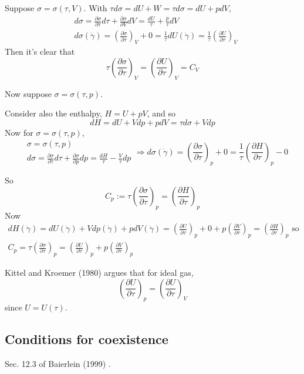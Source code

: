 \documentclass[10pt]{amsart}
\begin{document}
\begin{multicols*}{2}
Suppose $\sigma = \sigma(\tau, V)$.  With $\tau d\sigma = dU + W = \tau d\sigma = dU + pdV$, 
\[
\begin{aligned}
  & d\sigma = \frac{ \partial \sigma }{ \partial \tau } d\tau + \frac{ \partial \sigma }{ \partial V} dV = \frac{dU}{ \tau} + \frac{p}{\tau} dV \\ 
  & d\sigma(\dot{\gamma}) = \left( \frac{ \partial \sigma}{ \partial \tau} \right)_V + 0 = \frac{1}{\tau} dU(\dot{\gamma}) = \frac{1}{\tau} \left( \frac{ \partial U}{ \partial \tau} \right)_V
\end{aligned}
\]
Then it's clear that 
\[
\tau \left( \frac{ \partial \sigma }{ \partial \tau } \right)_V = \left( \frac{ \partial U}{ \partial \tau} \right)_V = C_V
\]

Now suppose $\sigma = \sigma(\tau, p)$.  

Consider also the enthalpy,  $H = U + pV$, and so
\[
dH = dU + Vdp + pdV = \tau d\sigma + Vdp
\]
Now for $\sigma = \sigma(\tau,p)$,
\[
\begin{aligned}
  & \sigma = \sigma(\tau,p) \\ 
  & d\sigma = \frac{ \partial \sigma }{ \partial \tau} d\tau + \frac{ \partial \sigma }{ \partial p } dp = \frac{dH}{\tau} - \frac{V}{\tau} dp
\end{aligned} \Longrightarrow d\sigma(\dot{\gamma}) = \left( \frac{ \partial \sigma }{ \partial \tau} \right)_p + 0 = \frac{1}{\tau} \left( \frac{ \partial H}{ \partial \tau} \right)_p - 0 
\]

So 
\[
C_p := \tau \left( \frac{ \partial \sigma }{ \partial \tau } \right)_p = \left( \frac{ \partial H}{ \partial \tau} \right)_p
\]
Now 
\[
\begin{gathered}
  dH(\dot{\gamma}) = dU(\dot{\gamma}) + Vdp(\dot{\gamma} ) + pdV(\dot{\gamma}) = \left( \frac{ \partial U }{ \partial \tau} \right)_p + 0 + p \left( \frac{ \partial V}{ \partial \tau} \right)_p = \left( \frac{ \partial H }{ \partial \tau } \right)_p \text{ so } \\ 
  C_p = \tau \left( \frac{ \partial \sigma }{ \partial \tau} \right)_p = \left( \frac{ \partial U}{ \partial \tau} \right)_p + p\left( \frac{ \partial V}{ \partial \tau} \right)_p 
\end{gathered}
\]

Kittel and Kroemer (1980) \cite{CKittelHKroemer1980} argues that for ideal gas, 
\[
\left( \frac{ \partial U}{ \partial \tau} \right)_p = \left( \frac{ \partial U}{ \partial \tau} \right)_V
\]
since $U = U(\tau)$.  

\subsection{Conditions for coexistence} Sec. 12.3 of Baierlein (1999) \cite{RBaierlein1999}.  


\end{multicols*}
\end{document}
